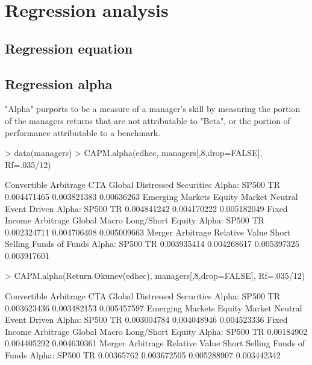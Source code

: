 \documentclass[12pt,letterpaper,english]{article}
\begin{document}
\section{Regression analysis}

\subsection{Regression equation}


\subsection{Regression alpha }

"Alpha" purports to be a measure of a manager's skill by measuring the portion of the managers returns that are not attributable to "Beta", or the portion of performance attributable to a benchmark.

\begin{Schunk}
\begin{Sinput}
> data(managers)
> CAPM.alpha(edhec, managers[,8,drop=FALSE], Rf=.035/12)
\end{Sinput}
\begin{Soutput}
                Convertible Arbitrage  CTA Global Distressed Securities
Alpha: SP500 TR           0.004471465 0.003821383            0.00636263
                Emerging Markets Equity Market Neutral Event Driven
Alpha: SP500 TR      0.004841242           0.004170222  0.005182049
                Fixed Income Arbitrage Global Macro Long/Short Equity
Alpha: SP500 TR            0.002324711  0.004706408       0.005009663
                Merger Arbitrage Relative Value Short Selling Funds of Funds
Alpha: SP500 TR      0.003935414    0.004268617   0.005397325    0.003917601
\end{Soutput}
\begin{Sinput}
> CAPM.alpha(Return.Okunev(edhec), managers[,8,drop=FALSE], Rf=.035/12)
\end{Sinput}
\begin{Soutput}
                Convertible Arbitrage  CTA Global Distressed Securities
Alpha: SP500 TR           0.003623436 0.003482153           0.005457597
                Emerging Markets Equity Market Neutral Event Driven
Alpha: SP500 TR      0.003004784           0.004048946  0.004523336
                Fixed Income Arbitrage Global Macro Long/Short Equity
Alpha: SP500 TR             0.00184902  0.004405292       0.004630361
                Merger Arbitrage Relative Value Short Selling Funds of Funds
Alpha: SP500 TR       0.00365762    0.003672505   0.005288907    0.003442342
\end{Soutput}
\end{Schunk}
\end{document}
